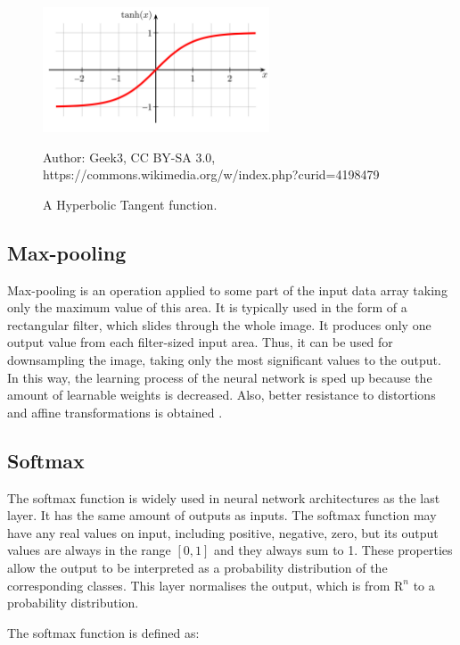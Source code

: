 \begin{figure}[!h]
  \centering
  \includegraphics[width=0.6\textwidth]{./fig/photos/hyperbolic_tangent.png}

  \caption{A Hyperbolic Tangent function.}
  Author: Geek3, CC BY-SA 3.0, https://commons.wikimedia.org/w/index.php?curid=4198479
  \label{fig:htangent}
\end{figure}


\subsection{Max-pooling}

Max-pooling is an operation applied to some part of the input data array taking only the maximum value of this area. It is typically used in the form of a rectangular filter, which slides through the whole image. It produces only one output value from each filter-sized input area. Thus, it can be used for downsampling the image, taking only the most significant values to the output. In this way, the learning process of the neural network is sped up because the amount of learnable weights is decreased. Also, better resistance to distortions and affine transformations is obtained \cite{yu2014mixed}.

\subsection{Softmax}

The softmax function is widely used in neural network architectures as the last layer. It has the same amount of outputs as inputs. The softmax function may have any real values on input, including positive, negative, zero, but its output values are always in the range $[0, 1]$ and they always sum to 1. These properties allow the output to be interpreted as a probability distribution of the corresponding classes. This layer normalises the output, which is from $\textrm{R}^n$ to a probability distribution.

The softmax function is defined as:

